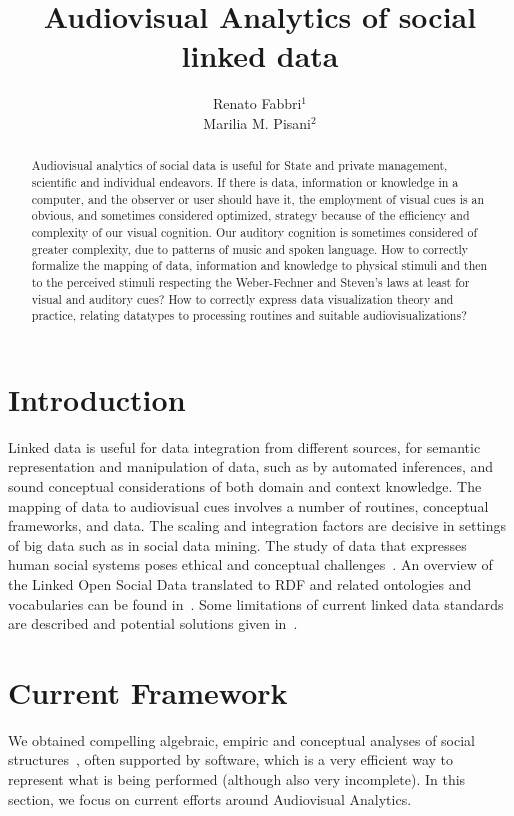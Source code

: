 \documentclass[letterpaper,10pt]{article}
\begin{document}
\title{Audiovisual Analytics of social linked data}

\author{Renato Fabbri$^1$\\
	Marilia M. Pisani$^2$
}
\address{$^1$IFSC/USP, $^2$CCNH/UFABC}

\begin{abstract}
	Audiovisual analytics of social data is useful for State and private
	management, scientific and individual endeavors.
	If there is data, information or knowledge in a computer,
	and the observer or user should have it, the employment of visual cues is an obvious,
	and sometimes considered optimized, strategy because of the efficiency and
	complexity of our visual cognition.
	Our auditory cognition is sometimes considered of greater complexity,
	due to patterns of music and spoken language.
	How to correctly formalize the mapping of data, information
	and knowledge to physical stimuli
	and then to the perceived stimuli
	respecting the Weber-Fechner and Steven's laws at least for visual
	and auditory cues?
	How to correctly express data visualization theory and practice,
	relating datatypes to processing routines and suitable audiovisualizations?
\end{abstract}

\section{Introduction}
Linked data is useful for data integration from different sources,
for semantic representation and manipulation of data,
such as by automated inferences,
and sound conceptual considerations of both domain and context
knowledge.
The mapping of data to audiovisual cues
involves a number of routines, conceptual frameworks,
and data.
The scaling and integration factors are decisive in settings
of big data such as in social data mining.
The study of data that expresses human social systems
poses ethical and conceptual challenges~\cite{an,an2}.
An overview of the Linked Open Social Data translated to
RDF and related ontologies and vocabularies
can be found in~\cite{nuvem1,tese,losd}.
Some limitations of current linked data standards
are described and potential solutions given in~\cite{ont}.

\section{Current Framework}\label{current}
We obtained compelling algebraic, empiric and conceptual
analyses of social structures~\cite{tese,stab},
often supported by software, which is a very efficient
way to represent
what is being performed (although also very incomplete).
In this section, we focus on current efforts around Audiovisual Analytics.
\end{document}
